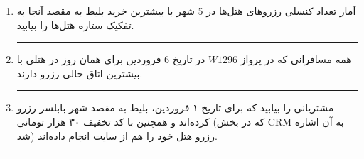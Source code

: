 \begin{enumerate}
	
	\pagebreak	
	
	\item
	آمار تعداد کنسلی رزروهای هتل‌ها در 5 شهر با بیشترین خرید بلیط به مقصد آنجا به‌ تفکیک ستاره هتل‌ها را بیابید.
	
	
	\rule{\linewidth}{0.05mm}	 
	
	
	
	\item
	همه مسافرانی که در پرواز $W1296$ در تاریخ 6 فروردین برای همان روز در هتلی با بیشترین اتاق خالی رزرو دارند.
	
	
	\rule{\linewidth}{0.05mm}
	
	
	\item
	مشتریانی را بیابید که برای تاریخ ۱ فروردین، بلیط به مقصد شهر بابلسر رزرو کرده‌اند و همچنین \linebreak با کد تخفیف ۳۰ هزار تومانی (که در بخش CRM به‌ آن اشاره شد) رزرو هتل خود را هم از سایت انجام داده‌اند.
	
	
	\rule{\linewidth}{0.05mm}	 
	
	
	
\end{enumerate}